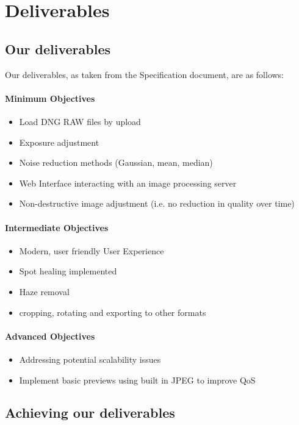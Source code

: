 \documentclass[14pt]{article}
\begin{document}
\section{Deliverables}
\subsection{Our deliverables}
Our deliverables, as taken from the Specification document, are as follows:

\paragraph{Minimum Objectives}
    \begin{itemize}
      \item Load DNG RAW files by upload
      \item Exposure adjustment
      \item Noise reduction methods (Gaussian, mean, median)
      \item Web Interface interacting with an image processing server
      \item Non-destructive image adjustment (i.e. no reduction in quality over time)
    \end{itemize}
\paragraph{Intermediate Objectives}
    \begin{itemize}
      \item Modern, user friendly User Experience
      \item Spot healing implemented
      \item Haze removal
      \item cropping, rotating and exporting to other formats
    \end{itemize}
\paragraph{Advanced Objectives}
    \begin{itemize}
      \item Addressing potential scalability issues
      \item Implement basic previews using built in JPEG to improve QoS
    \end{itemize}

\subsection{Achieving our deliverables}
\end{document}
